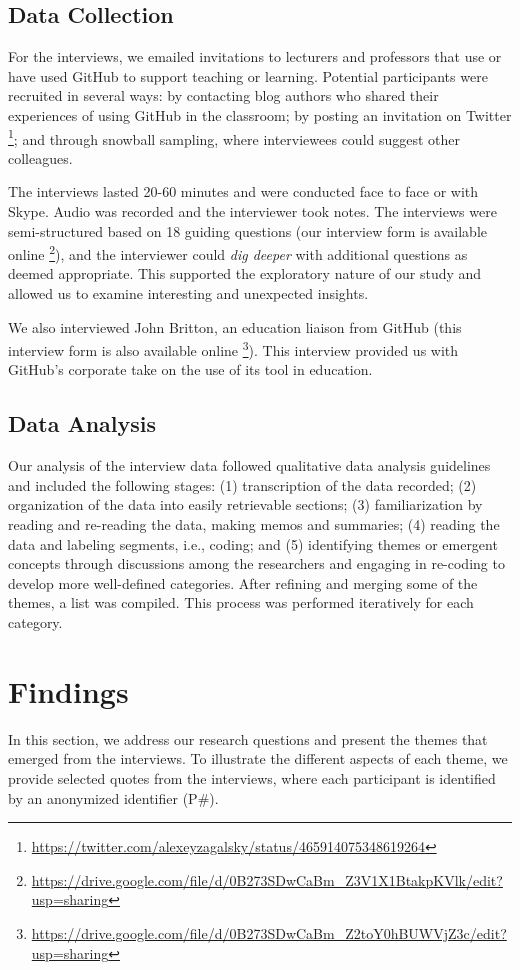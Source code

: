 \subsection{Data Collection}
For the interviews, we emailed invitations to lecturers and professors that use or have used GitHub to support teaching or learning. Potential participants were recruited in several ways: by contacting blog authors who shared their experiences of using GitHub in the classroom; by posting an invitation on Twitter \footnote{\url{https://twitter.com/alexeyzagalsky/status/465914075348619264}}; and through snowball sampling, where interviewees could suggest other colleagues.

The interviews lasted 20-60 minutes and were conducted face to face or with Skype. Audio was recorded and the interviewer took notes. The interviews were semi-structured based on 18 guiding questions (our interview form is available online \footnote{\url{https://drive.google.com/file/d/0B273SDwCaBm_Z3V1X1BtakpKVlk/edit?usp=sharing}}), and the interviewer could \textit{dig deeper} with additional questions as deemed appropriate. This supported the exploratory nature of our study and allowed us to examine interesting and unexpected insights.

We also interviewed John Britton, an education liaison from GitHub (this interview form is also available online \footnote{\url{https://drive.google.com/file/d/0B273SDwCaBm_Z2toY0hBUWVjZ3c/edit?usp=sharing}}). This interview provided us with GitHub's corporate take on the use of its tool in education.

\subsection{Data Analysis}
Our analysis of the interview data followed qualitative data analysis guidelines \cite{lacey2001qualitative,seaman1999qualitative} and included the following stages: (1) transcription of the data recorded; (2) organization of the data into easily retrievable sections; (3) familiarization by reading and re-reading the data, making memos and summaries; (4) reading the data and labeling segments, i.e., coding; and (5) identifying themes or emergent concepts through discussions among the researchers and engaging in re-coding to develop more well-defined categories. After refining and merging some of the themes, a list was compiled. This process was performed iteratively for each category.

\section{Findings}
\label{sec:results}
In this section, we address our research questions and present the themes that emerged from the interviews. To illustrate the different aspects of each theme, we provide selected quotes from the interviews, where each participant is identified by an anonymized identifier (P\#).

